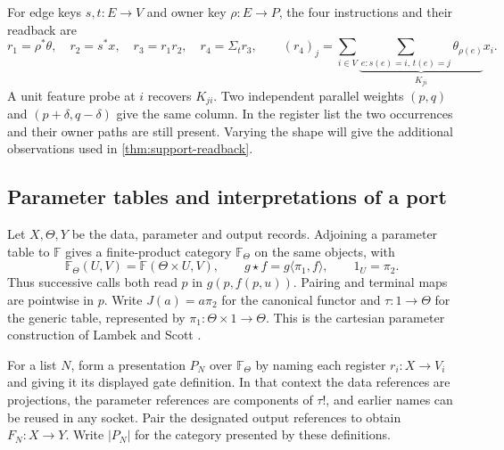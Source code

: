 \documentclass[11pt,a4paper]{article}
\theoremstyle{definition}
\theoremstyle{remark}\newaliascnt{remark}{theorem}
\numberwithin{equation}{section}
\begin{document}
For edge keys \(s,t:E\to V\) and owner key \(\rho:E\to P\), the four instructions and their readback are
\[
 r_1=\rho^*\theta,\quad r_2=s^*x,\quad r_3=r_1r_2,\quad r_4=\Sigma_t r_3,\qquad
 (r_4)_j=\sum_{i\in V}\underbrace{\sum_{e:s(e)=i,\,t(e)=j}\theta_{\rho(e)}}_{K_{ji}}x_i.
\]
A unit feature probe at \(i\) recovers \(K_{ji}\). Two independent parallel weights \((p,q)\) and \((p+\delta,q-\delta)\) give the same column. In the register list the two occurrences and their owner paths are still present. Varying the shape will give the additional observations used in \cref{thm:support-readback}.

\subsection{Parameter tables and interpretations of a port}\label{sec:model-interfaces}
Let \(X,\Theta,Y\) be the data, parameter and output records. Adjoining a parameter table to \(\mathbb F\) gives a finite-product category \(\mathbb F_\Theta\) on the same objects, with
\[
 \mathbb F_\Theta(U,V)=\mathbb F(\Theta\times U,V),\qquad
 g\star f=g\langle\pi_1,f\rangle,\qquad 1_U=\pi_2 .
\]
Thus successive calls both read \(p\) in \(g(p,f(p,u))\). Pairing and terminal maps are pointwise in \(p\). Write \(J(a)=a\pi_2\) for the canonical functor and \(\tau:1\to\Theta\) for the generic table, represented by \(\pi_1:\Theta\times1\to\Theta\). This is the cartesian parameter construction of Lambek and Scott \cite[Part I, Proposition 6.1]{lambek-scott}.

For a list \(N\), form a presentation \(P_N\) over \(\mathbb F_\Theta\) by naming each register \(r_i:X\to V_i\) and giving it its displayed gate definition. In that context the data references are projections, the parameter references are components of \(\tau!\), and earlier names can be reused in any socket. Pair the designated output references to obtain \(F_N:X\to Y\). Write \(|P_N|\) for the category presented by these definitions.
\end{document}
